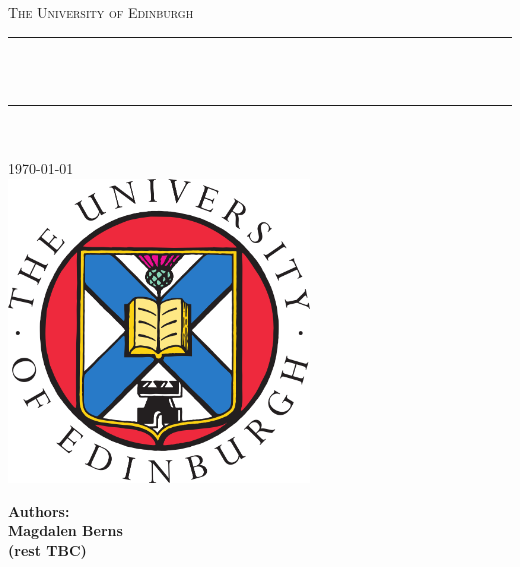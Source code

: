 \documentclass[12pt, a4paper, oneside]{Thesis}
\title{\ttitle}
\let\oldincludegraphics\includegraphics
\renewcommand{\includegraphics}[2][]{
  \oldincludegraphics[width=8cm]{#2}}
\begin{document}
\frontmatter %
\fancyhead{} %
\rhead{\thepage} %
\lhead{} %
\pagestyle{fancy}
\newcommand{\HRule}{\rule{\linewidth}{0.5mm}} %





\begin{titlepage}
\begin{center}

\textsc{\LARGE The University of Edinburgh}\\[1.5cm]
\HRule \\[0.8cm] %

\textsc{\huge \bfseries \ttitle }\\[0.2cm]
\HRule \\[0.5cm] %
\textsc{\Large \deptname}\\[1.0cm]

\large \today \\[1cm]

\includegraphics[width=2.0cm]{logo}\\[1cm]
\end{center}

\begin{minipage}{0.4\textwidth}
\begin{flushleft} \large
\bf{Authors: \\
Magdalen Berns \\
(rest TBC)}
\end{flushleft}
\end{minipage}\\[0.5cm]




\end{titlepage}


\end{document}
